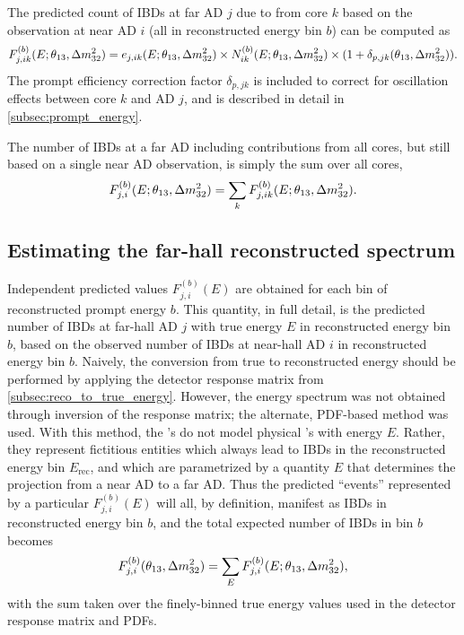The predicted count of IBDs at far AD $j$ due to \nuebar{} from core $k$
based on the observation at near AD $i$ (all in reconstructed energy bin $b$) can be computed as
\begin{equation}\label{eq:far_true_core_pred}
    F_{j,ik}^{(b)}(E;\theta_{13},\Delta m^2_{32}) = e_{j,ik}(E;\theta_{13},\Delta m^2_{32}) \times
        N_{ik}^{(b)}(E;\theta_{13},\Delta m^2_{32}) \times
        (1 + \delta_{p,jk}(\theta_{13}, \Delta m^2_{32})).
\end{equation}
The prompt efficiency correction factor $\delta_{p,jk}$ is included
to correct for oscillation effects between core $k$ and AD $j$,
and is described in detail in \cref{subsec:prompt_energy}.

The number of IBDs at a far AD including contributions from all cores,
but still based on a single near AD observation,
is simply the sum over all cores,
\begin{equation}
    F_{j,i}^{(b)}(E;\theta_{13},\Delta m^2_{32}) = \sum_k F_{j,ik}^{(b)}(E;\theta_{13},\Delta m^2_{32}).
\end{equation}

\subsection{Estimating the far-hall reconstructed spectrum}
\label{subsec:true_to_reco_farhall}

Independent predicted values $F_{j,i}^{(b)}(E)$ are obtained
for each bin of reconstructed prompt energy $b$.
This quantity, in full detail,
is the predicted number of IBDs at far-hall AD $j$
with true \nuebar{} energy $E$ in reconstructed energy bin $b$,
based on the observed number of IBDs at near-hall AD $i$
in reconstructed energy bin $b$.
Naively, the conversion from true to reconstructed energy
should be performed by applying the detector response matrix
from \cref{subsec:reco_to_true_energy}.
However, the \nuebar{} energy spectrum was not obtained
through inversion of the response matrix;
the alternate, PDF-based method was used.
With this method, the \nuebar{}'s do not model physical \nuebar{}'s with energy $E$.
Rather, they represent fictitious entities which always
lead to IBDs in the reconstructed energy bin $E_\text{rec}$,
and which are parametrized by a quantity $E$ that determines
the projection from a near AD to a far AD.
Thus the predicted ``events'' represented by a particular
$F_{j,i}^{(b)}(E)$ will all, by definition,
manifest as IBDs in reconstructed energy bin $b$,
and the total expected number of IBDs in bin $b$ becomes
\begin{equation}
    F_{j,i}^{(b)}(\theta_{13},\Delta m^2_{32}) = \sum_E F_{j,i}^{(b)}(E;\theta_{13},\Delta m^2_{32}),
\end{equation}
with the sum taken over the finely-binned true energy values
used in the detector response matrix and PDFs.

